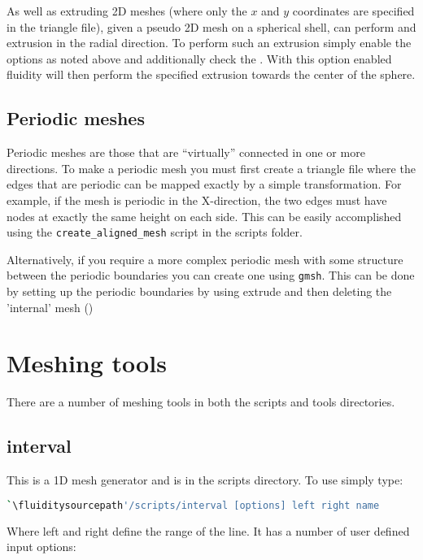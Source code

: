 As well as extruding 2D meshes (where only the $x$ and $y$ coordinates are specified in the triangle file),
given a pseudo 2D mesh on a spherical shell, \fluidity can perform and extrusion in the radial 
direction. To perform such an extrusion simply enable the options as noted above and additionally 
check the . With this option enabled fluidity will then perform the 
specified extrusion towards the center of the sphere.

\subsection{Periodic meshes}
\label{mesh!mesh types!periodic} 
Periodic meshes are those that are ``virtually'' connected in one or more directions. To make a periodic
mesh you must first create a triangle file where the edges that are periodic
can be mapped exactly by a simple transformation. For example, if the mesh
is periodic in the X-direction, the two edges must have nodes at exactly the
same height on each side. This can be easily accomplished using the
\lstinline[language=Bash]+create_aligned_mesh+ script in the scripts folder.

Alternatively, if you require a more complex periodic mesh with some structure between the periodic 
boundaries you can create one using \lstinline[language=Bash]{gmsh}. This can be done by 
setting up the periodic boundaries by using extrude and then deleting the 'internal' mesh (\website)

\section{Meshing tools}

There are a number of meshing tools in both the scripts and tools directories.

\subsection{interval}
This is a 1D mesh generator and is in the scripts directory. To use simply type:


\begin{lstlisting}[language = Bash]
`\fluiditysourcepath'/scripts/interval [options] left right name 
\end{lstlisting}

Where left and right define the range of the line. It has a number of user defined input options:

